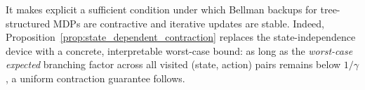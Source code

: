 \documentclass[preprint,12pt]{elsarticle} %
\theoremstyle{plain}
\newtheorem{proposition}[theorem]{Proposition}
\theoremstyle{definition}
\theoremstyle{remark}
\begin{document}

It makes explicit a sufficient condition under which Bellman backups for tree-structured MDPs are contractive and iterative updates are stable. Indeed, Proposition~\ref{prop:state_dependent_contraction} replaces the state-independence device with a concrete, interpretable worst-case bound: as long as the \emph{worst-case expected} branching factor across all visited (state, action) pairs remains below \(1/\gamma\), a uniform contraction guarantee follows.
\end{document}
